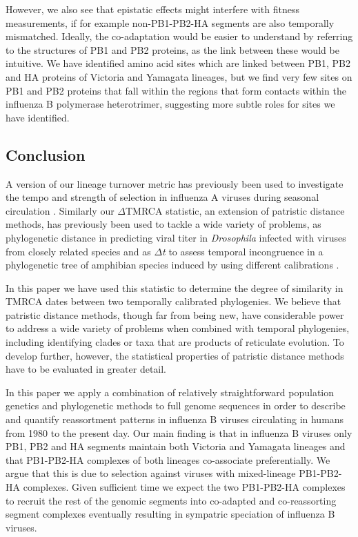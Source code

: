 \documentclass[11pt,oneside,letterpaper]{article}
\begin{document}
However, we also see that epistatic effects might interfere with fitness measurements, if for example non-PB1-PB2-HA segments are also temporally mismatched.
Ideally, the co-adaptation would be easier to understand by referring to the structures of PB1 and PB2 proteins, as the link between these would be intuitive.
We have identified amino acid sites which are linked between PB1, PB2 and HA proteins of Victoria and Yamagata lineages, but we find very few sites on PB1 and PB2 proteins that fall within the regions that form contacts within the influenza B polymerase heterotrimer, suggesting more subtle roles for sites we have identified.

\subsection*{Conclusion}
A version of our lineage turnover metric has previously been used to investigate the tempo and strength of selection in influenza A viruses during seasonal circulation \cite{bedford2011}.
Similarly our $\Delta$TMRCA statistic, an extension of patristic distance methods, has previously been used to tackle a wide variety of problems, as phylogenetic distance in predicting viral titer in \textit{Drosophila} infected with viruses from closely related species \cite{longdon2011} and as \textit{$\Delta$t} to assess temporal incongruence in a phylogenetic tree of amphibian species induced by using different calibrations \cite{ruane2011}.

In this paper we have used this statistic to determine the degree of similarity in TMRCA dates between two temporally calibrated phylogenies.
We believe that patristic distance methods, though far from being new, have considerable power to address a wide variety of problems when combined with temporal phylogenies, including identifying clades or taxa that are products of reticulate evolution.
To develop further, however, the statistical properties of patristic distance methods have to be evaluated in greater detail.

In this paper we apply a combination of relatively straightforward population genetics and phylogenetic methods to full genome sequences in order to describe and quantify reassortment patterns in influenza B viruses circulating in humans from 1980 to the present day.
Our main finding is that in influenza B viruses only PB1, PB2 and HA segments maintain both Victoria and Yamagata lineages and that PB1-PB2-HA complexes of both lineages co-associate preferentially. 
We argue that this is due to selection against viruses with mixed-lineage PB1-PB2-HA complexes.
Given sufficient time we expect the two PB1-PB2-HA complexes to recruit the rest of the genomic segments into co-adapted and co-reassorting segment complexes eventually resulting in sympatric speciation of influenza B viruses.
\end{document}
